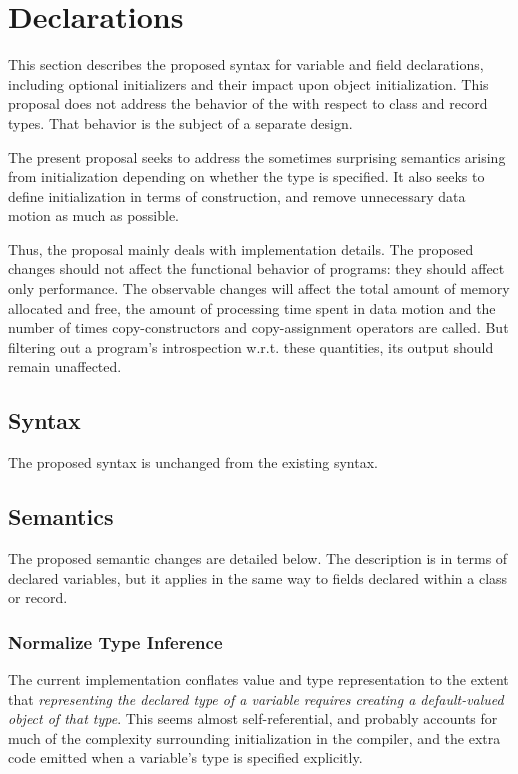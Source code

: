 \section{Declarations}
\label{Declarations}

This section describes the proposed syntax for variable and field declarations, including
optional initializers and their impact upon object initialization.  This proposal does not
address the behavior of the  with respect to class and record
types.  That behavior is the subject of a separate design.

The present proposal seeks to address the sometimes surprising semantics arising from
initialization depending on whether the type is specified.  It also seeks to define
initialization in terms of construction, and remove unnecessary data motion as much as
possible.

Thus, the proposal mainly deals with implementation details.  The proposed changes should
not affect the functional behavior of programs: they should affect only performance.  The
observable changes will affect the total amount of memory allocated and free, the amount
of processing time spent in data motion and the number of times copy-constructors and
copy-assignment operators are called.  But filtering out a program's introspection
w.r.t. these quantities, its output should remain unaffected.

\subsection{Syntax}

The proposed syntax is unchanged from the existing syntax.

\subsection{Semantics}

The proposed semantic changes are detailed below.  The description is in terms of declared
variables, but it applies in the same way to fields declared within a class or record.

\subsubsection{Normalize Type Inference}

The current implementation conflates value and type representation to the extent that
\emph{representing the declared type of a variable requires creating a default-valued
  object of that type}.  This seems almost self-referential, and probably accounts for
much of the complexity surrounding initialization in the compiler, and the extra code
emitted when a variable's type is specified explicitly.


